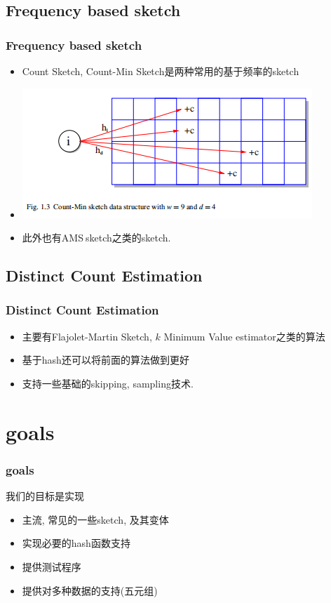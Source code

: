 \documentclass[cjk]{beamer}
\begin{document}
\begin{CJK*}{UTF8}{gbsn}
  \subsection{Frequency based sketch}
    \begin{frame}
      \frametitle{Frequency based sketch}
      \begin{itemize}
        \item Count Sketch, Count-Min Sketch是两种常用的基于频率的sketch
        \item \includegraphics[scale = 0.5]{1.png}
        \item 此外也有AMS$\ $sketch之类的sketch.
      \end{itemize}
    \end{frame}

  \subsection{Distinct Count Estimation}
    \begin{frame}
      \frametitle{Distinct Count Estimation}
      \begin{itemize}
        \item 主要有Flajolet-Martin Sketch, $k$ Minimum Value estimator之类的算法
        \item 基于hash还可以将前面的算法做到更好
        \item 支持一些基础的skipping, sampling技术.
      \end{itemize}
    \end{frame}

\section{goals}
  \begin{frame}
    \frametitle{goals}
    我们的目标是实现
    \begin{itemize}
      \item 主流, 常见的一些sketch, 及其变体
      \item 实现必要的hash函数支持
      \item 提供测试程序
      \item 提供对多种数据的支持(五元组)
    \end{itemize}
  \end{frame}

\end{CJK*}
\end{document}
